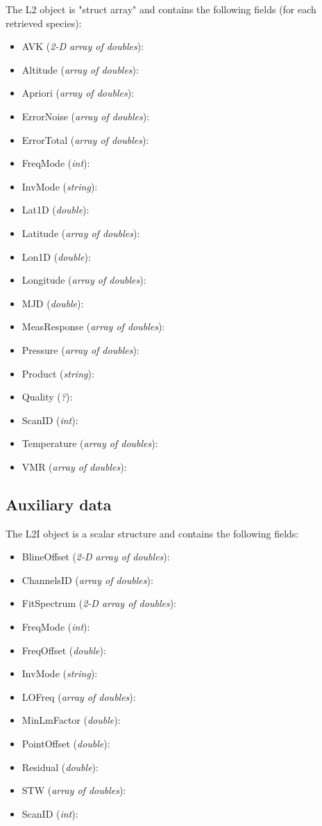 The L2 object is "struct array" and contains the following fields (for each retrieved species):
\begin{itemize}

    \item AVK (\emph{2-D array of doubles}):
    \item Altitude (\emph{array of doubles}):
    \item Apriori (\emph{array of doubles}):
    \item ErrorNoise (\emph{array of doubles}):
    \item ErrorTotal (\emph{array of doubles}):
    \item FreqMode (\emph{int}):
    \item InvMode (\emph{string}):
    \item Lat1D (\emph{double}):
    \item Latitude  (\emph{array of doubles}):
    \item Lon1D (\emph{double}):
    \item Longitude  (\emph{array of doubles}):
    \item MJD (\emph{double}):
    \item MeasResponse (\emph{array of doubles}):
    \item Pressure (\emph{array of doubles}):
    \item Product (\emph{string}):
    \item Quality (\emph{?}):
    \item ScanID (\emph{int}):
    \item Temperature (\emph{array of doubles}):
    \item VMR (\emph{array of doubles}):

\end{itemize}

\subsection{Auxiliary data}

The L2I object is a scalar structure and contains the following fields:
\begin{itemize}
  \item BlineOffset (\emph{2-D array of doubles}):
  \item ChannelsID (\emph{array of doubles}):
  \item FitSpectrum (\emph{2-D array of doubles}):
  \item FreqMode (\emph{int}):
  \item FreqOffset (\emph{double}):
  \item InvMode (\emph{string}):
  \item LOFreq (\emph{array of doubles}):
  \item MinLmFactor (\emph{double}):
  \item PointOffset (\emph{double}):
  \item Residual (\emph{double}):
  \item STW (\emph{array of doubles}):
  \item ScanID (\emph{int}):
\end{itemize}



